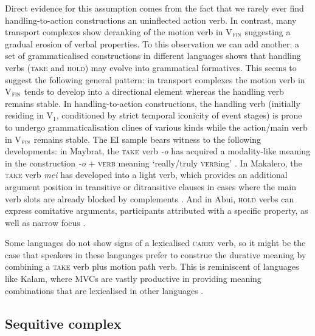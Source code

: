 Direct evidence for this assumption comes from the fact that we rarely ever find handling-to-action constructions an uninflected action verb. In contrast, many transport complexes show deranking of the motion verb in V$_{\textsc{fin}}$ suggesting a gradual erosion of verbal properties. To this observation we can add another: a set of grammaticalised constructions in different languages shows that handling verbs (\textsc{take} and \textsc{hold)} may evolve into grammatical formatives. This seems to suggest the following general pattern: in transport complexes the motion verb in V$_{\textsc{fin}}$ tends to develop into a directional element whereas the handling verb remains stable. In handling-to-action constructions, the handling verb (initially residing in V$_{1}$, conditioned by strict temporal iconicity of event stages) is prone to undergo grammaticalisation clines of various kinds while the action/main verb in V$_{\textsc{fin}}$ remains stable. The EI sample bears witness to the following developments: in Maybrat, the \textsc{take} verb \textit{-o} has acquired a modality-like meaning in the construction \textit{-o} + \textsc{verb} meaning `really/truly \textsc{verb}ing' \citep[195]{dol2007grammar}. In Makalero, the \textsc{take} verb \textit{mei} has developed into a light verb, which provides an additional argument position in transitive or ditransitive clauses in cases where the main verb slots are already blocked by complements \citep[203]{huber2011}. And in Abui, \textsc{hold} verbs can express comitative arguments, participants attributed with a specific property, as well as narrow focus \citep[382--7]{kratochvil2007grammar}.

Some languages do not show signs of a lexicalised \textsc{carry} verb, so it might be the case that speakers in these languages prefer to construe the durative meaning by combining a \textsc{take} verb plus motion path verb. This is reminiscent of languages like Kalam, where MVCs are vastly productive in providing meaning combinations that are lexicalised in other languages \citep{pawley2011event}. 

\subsection{Sequitive complex} \label{sec:sequitive}

